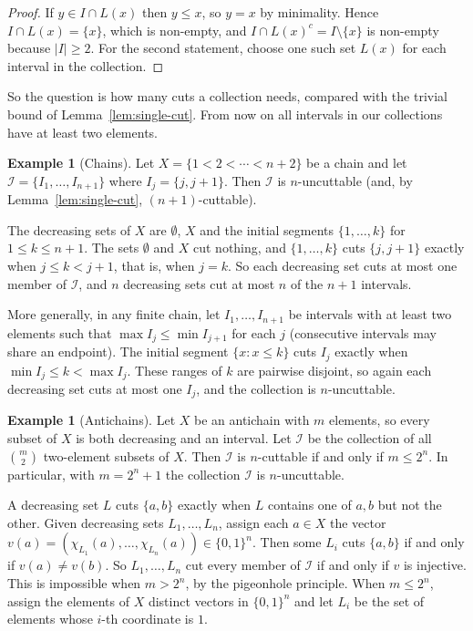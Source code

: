\documentclass[10pt, a4paper]{article}
\theoremstyle{plain}
\theoremstyle{definition}
\newtheorem{example}[theorem]{Example}
\newcommand{\I}{\mathcal{I}}
\begin{document}
\begin{proof}
  If $y\in I\cap L(x)$ then $y\le x$, so $y=x$ by minimality. Hence
  $I\cap L(x)=\{x\}$, which is non-empty, and $I\cap L(x)^c = I\setminus\{x\}$ is
  non-empty because $|I|\ge 2$. For the second statement, choose one such set $L(x)$
  for each interval in the collection.
\end{proof}

So the question is how many cuts a collection needs, compared with the trivial bound
of Lemma~\ref{lem:single-cut}. From now on all intervals in our collections have at
least two elements.

\begin{example}[Chains]\label{ex:chain}
  Let $X=\{1<2<\cdots<n+2\}$ be a chain and let $\I=\{I_1,\ldots,I_{n+1}\}$ where
  $I_j=\{j,j+1\}$. Then $\I$ is $n$-uncuttable (and, by Lemma~\ref{lem:single-cut},
  $(n+1)$-cuttable).

  The decreasing sets of $X$ are $\emptyset$, $X$ and the initial segments
  $\{1,\ldots,k\}$ for $1\le k\le n+1$. The sets $\emptyset$ and $X$ cut nothing, and
  $\{1,\ldots,k\}$ cuts $\{j,j+1\}$ exactly when $j\le k<j+1$, that is, when $j=k$.
  So each decreasing set cuts at most one member of $\I$, and $n$ decreasing sets cut
  at most $n$ of the $n+1$ intervals.

  More generally, in any finite chain, let $I_1,\ldots,I_{n+1}$ be intervals with at
  least two elements such that $\max I_j\le\min I_{j+1}$ for each $j$ (consecutive
  intervals may share an endpoint). The initial segment $\{x : x\le k\}$ cuts $I_j$
  exactly when $\min I_j\le k<\max I_j$. These ranges of $k$ are pairwise disjoint,
  so again each decreasing set cuts at most one $I_j$, and the collection is
  $n$-uncuttable.
\end{example}

\begin{example}[Antichains]\label{ex:antichain}
  Let $X$ be an antichain with $m$ elements, so every subset of $X$ is both decreasing
  and an interval. Let $\I$ be the collection of all $\binom{m}{2}$ two-element
  subsets of $X$. Then $\I$ is $n$-cuttable if and only if $m\le 2^n$. In particular,
  with $m=2^n+1$ the collection $\I$ is $n$-uncuttable.

  A decreasing set $L$ cuts $\{a,b\}$ exactly when $L$ contains one of $a,b$ but not
  the other. Given decreasing sets $L_1,\ldots,L_n$, assign each $a\in X$ the vector
  $v(a)=(\chi_{L_1}(a),\ldots,\chi_{L_n}(a))\in\{0,1\}^n$. Then some $L_i$ cuts
  $\{a,b\}$ if and only if $v(a)\ne v(b)$. So $L_1,\ldots,L_n$ cut every member of
  $\I$ if and only if $v$ is injective. This is impossible when $m>2^n$, by the
  pigeonhole principle. When $m\le 2^n$, assign the elements of $X$ distinct vectors
  in $\{0,1\}^n$ and let $L_i$ be the set of elements whose $i$-th coordinate is $1$.
\end{example}
\end{document}
